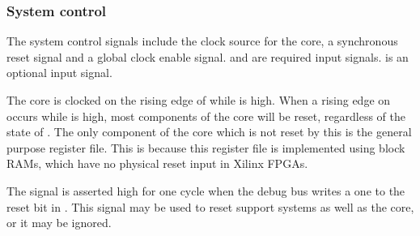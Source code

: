 
\subsubsection{System control}
\label{sec:core-ug-cfg-inst-port-syscon}

The system control signals include the clock source for the core, a synchronous 
reset signal and a global clock enable signal.  and  are 
required  input signals.  is an optional 
 input signal.

The core is clocked on the rising edge of  while  is high. 
When a rising edge on  occurs while  is high, most
components of the core will be reset, regardless of the state of .
The only component of the core which is not reset by this is the general purpose
register file. This is because this register file is implemented using block
RAMs, which have no physical reset input in Xilinx FPGAs.

The  signal is asserted high for one cycle when the debug bus 
writes a one to the reset bit in . This signal may be used to reset 
support systems as well as the core, or it may be ignored.

